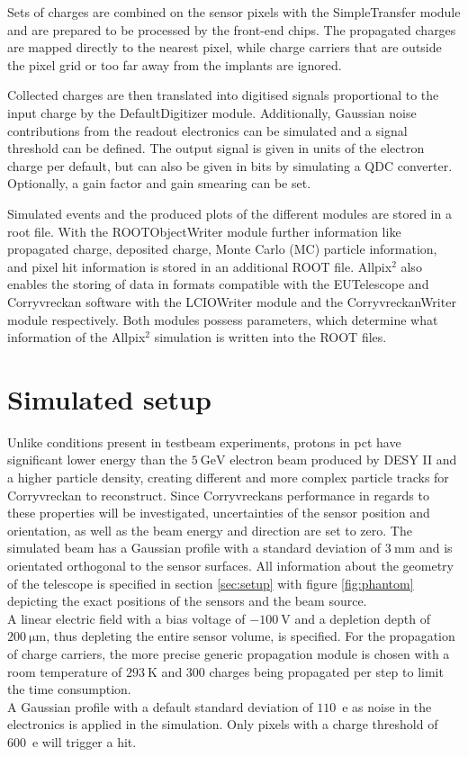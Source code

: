 Sets of charges are combined on the sensor pixels with the SimpleTransfer module and are prepared  to be processed by the front-end chips. The
propagated charges are mapped directly to the nearest pixel, while charge carriers that are outside the pixel grid or too far away from the implants are ignored.

Collected charges are then translated into digitised signals proportional to the input charge by the DefaultDigitizer module. Additionally, Gaussian noise contributions
from the readout electronics can be simulated and a signal threshold can be defined. The output signal is given in units of the electron charge per default, but
can also be given in bits by simulating a QDC converter. Optionally, a gain factor and gain smearing can be set.

Simulated events and the produced plots of the different modules are stored in a root file. With the ROOTObjectWriter module further information like propagated charge,
deposited charge, Monte Carlo (MC) particle information, and pixel hit information is stored in an additional ROOT file. Allpix$^2$ also enables the storing of
data in formats compatible with the EUTelescope and Corryvreckan software with the LCIOWriter module and the CorryvreckanWriter module respectively. Both modules possess parameters, which
determine what information of the Allpix$^2$ simulation is written into the ROOT files.

\section{Simulated setup}
Unlike conditions present in testbeam experiments, protons in pct have significant lower energy than the $\SI{5}{\giga\eV}$
electron beam produced by DESY II and a higher particle density, creating different and more complex particle tracks for
Corryvreckan to reconstruct. Since Corryvreckans performance in regards to these properties will be investigated, uncertainties
of the sensor position and orientation, as well as the beam energy and direction are set to zero. The simulated
beam has a Gaussian profile with a standard deviation of $\SI{3}{\milli\meter}$ and is orientated orthogonal to the sensor
surfaces. All information about the geometry of the telescope is specified in section \ref{sec:setup} with
figure \ref{fig:phantom} depicting the exact positions of the sensors and the beam source. \\ %
A linear electric field with a bias voltage of $\SI{-100}{\volt}$ and a depletion depth of $\SI{200}{\micro\meter}$,
thus depleting the entire sensor volume, is specified. For the propagation of charge carriers, the more precise generic propagation
module is chosen with a room temperature of $\SI{293}{\kelvin}$ and 300 charges being propagated per step to limit the time consumption.\\
A Gaussian profile with a default standard deviation of $110$\, e as noise in the electronics is applied in the simulation.
Only pixels with a charge threshold of $600$\, e will trigger a hit.

